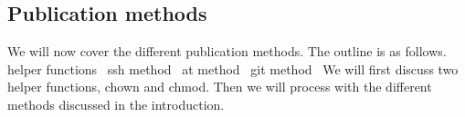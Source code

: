 \subsection{Publication methods}
\label{PubMethods}

We will now cover the different publication methods.
The outline is as follows.
\nwenddocs{}\endmoddef\nwstartdeflinemarkup{}\nwenddeflinemarkup
\LA{}helper functions~{\nwtagstyle{}}\RA{}
\LA{}ssh method~{\nwtagstyle{}}\RA{}
\LA{}at method~{\nwtagstyle{}}\RA{}
\LA{}git method~{\nwtagstyle{}}\RA{}
\nwendcode{}We will first discuss two helper functions, {\Tt{}chown\nwendquote} and {\Tt{}chmod\nwendquote}.
Then we will process with the different methods discussed in the introduction.

